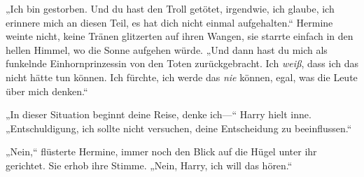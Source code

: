 „Ich bin gestorben. Und du hast den Troll getötet, irgendwie, ich glaube, ich erinnere mich an diesen Teil, es hat dich nicht einmal aufgehalten.“ Hermine weinte nicht, keine Tränen glitzerten auf ihren Wangen, sie starrte einfach in den hellen Himmel, wo die Sonne aufgehen würde. „Und dann hast du mich als funkelnde Einhornprinzessin von den Toten zurückgebracht. Ich \emph{weiß}, dass ich das nicht hätte tun können. Ich fürchte, ich werde das \emph{nie} können, egal, was die Leute über mich denken.“

„In dieser Situation beginnt deine Reise, denke ich—“ Harry hielt inne. „Entschuldigung, ich sollte nicht versuchen, deine Entscheidung zu beeinflussen.“

„Nein,“ flüsterte Hermine, immer noch den Blick auf die Hügel unter ihr gerichtet. Sie erhob ihre Stimme. „Nein, Harry, ich will das hören.“

